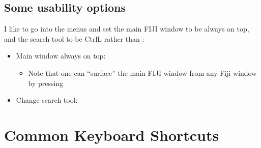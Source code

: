 \documentclass[letterpaper,10pt,english]{jupyterBook}
\begin{document}
\section{Some usability options}
\label{\detokenize{installation:some-usability-options}}
\sphinxAtStartPar
I like to go into the menus and set the main FIJI window to be always on top, and the search tool to be Ctrl\sphinxhyphen{}L rather than :
\begin{itemize}
\item {} 
\sphinxAtStartPar
Main window always on top: 
\begin{itemize}
\item {} 
\sphinxAtStartPar
Note that one can “surface” the main FIJI window from any Fiji window by pressing 

\end{itemize}

\item {} 
\sphinxAtStartPar
Change search tool: 

\end{itemize}

\sphinxstepscope


\chapter{Common Keyboard Shortcuts}
\label{\detokenize{keyboard-shortcuts:common-keyboard-shortcuts}}\label{\detokenize{keyboard-shortcuts::doc}}
\end{document}
